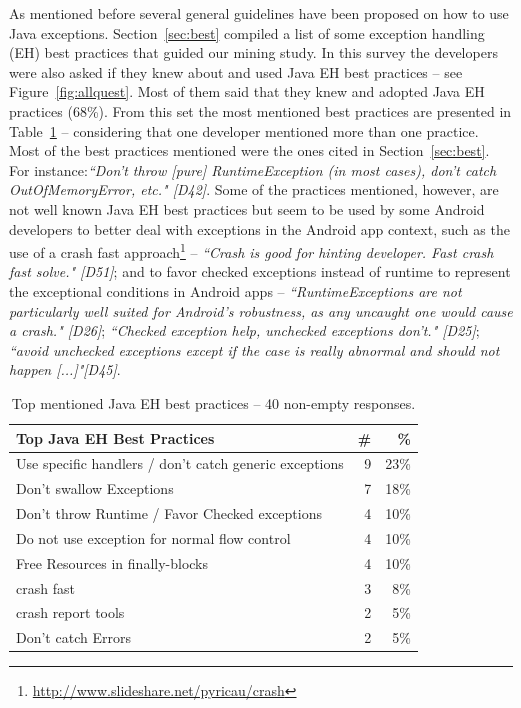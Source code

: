 
As mentioned before several general guidelines have been proposed on how to
use Java exceptions. Section~\ref{sec:best}  compiled a list of some exception handling (EH) best practices that guided our mining study. In this survey the developers were also asked if they knew about and used Java EH best practices -- see Figure~\ref{fig:allquest}. Most of them said that they knew and adopted Java EH practices (68\%). From this set the most mentioned best practices are presented in Table~\ref{tab:javapractices} -- considering that one developer mentioned more than one practice. Most of the best practices mentioned were the ones cited in Section~\ref{sec:best}. For instance:\emph{``Don't throw [pure] RuntimeException (in most cases), don't catch OutOfMemoryError, etc." [D42]}. Some of the practices mentioned, however, are not well known Java EH best practices but seem to be used by some Android developers to better deal with exceptions in the Android app context, such as the use of a crash fast approach\footnote{\url{http://www.slideshare.net/pyricau/crash}} -- \emph{``Crash is good for hinting developer. Fast crash fast solve." [D51]}; and to favor checked exceptions instead of runtime to represent the exceptional conditions in Android apps -- \emph{``RuntimeExceptions are not particularly well suited for Android's robustness, as any uncaught one would cause a crash." [D26]}; \emph{``Checked exception help, unchecked exceptions don't." [D25]}; \emph{``avoid unchecked exceptions except if the case is really abnormal and should not happen [...]"[D45]}.

\begin{table}
\scriptsize
\centering
\begin{tabular}{lrr}
\hline
\bfseries{Top Java EH Best Practices} & \bfseries{\#} & \bfseries{\%} \\
\hline
Use specific handlers / don't catch generic exceptions	& 9 & 23\% \\
Don't swallow Exceptions	 & 7 & 18\% \\
Don't throw Runtime / Favor Checked exceptions & 4 &	10\% \\
Do not use exception for normal  flow control &	4 &	10\% \\
Free Resources in finally-blocks	& 4	& 10\% \\
crash fast	 & 3 &	8\% \\
crash report tools	&  2 &	5\% \\
Don't catch Errors 	&  2 &	5\% \\
\hline
\end{tabular}
\caption{Top mentioned Java EH best practices -- 40 non-empty responses. }
\label{tab:javapractices}
\end{table}			
				
